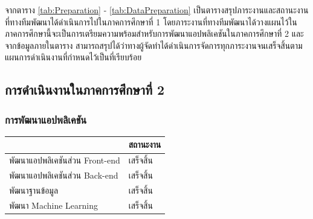 \documentclass[14pt,oneside,openright,a4paper]{cpe-thai-project}
\begin{document}
  จากตาราง \ref{tab:Preparation} - \ref{tab:DataPreparation} เป็นตารางสรุปภาระงานและสถานะงานที่ทางทีมพัฒนาได้ดำเนินการไปในภาคการศึกษาที่ 1 โดยภาระงานที่ทางทีมพัฒนาได้วางแผนไว้ในภาคการศึกษานี้จะเป็นการเตรียมความพร้อมสำหรับการพัฒนาแอปพลิเคชันในภาคการศึกษาที่ 2 
  และจากข้อมูลภายในตาราง สามารถสรุปได้ว่าทางผู้จัดทำได้ดำเนินการจัดการทุกภาระงานจนเสร็จสิ้นตามแผนการดำเนินงานที่กำหนดไว้เป็นที่เรียบร้อย

  \subsection{การดำเนินงานในภาคการศึกษาที่ 2}
  \subsubsection{การพัฒนาแอปพลิเคชัน}
    \begin{table}[H]\centering
      \begin{tabular}{|l|l|}
      \hline
      \rowcolor[HTML]{9FC5E8} 
      \multicolumn{1}{|c|}{\cellcolor[HTML]{9FC5E8}ภาระงาน} & \multicolumn{1}{c|}{\cellcolor[HTML]{9FC5E8}สถานะงาน} \\ \hline
      พัฒนาแอปพลิเคชันส่วน Front-end                                 & \cellcolor[HTML]{34FF34}เสร็จสิ้น                          \\ \hline
      พัฒนาแอปพลิเคชันส่วน Back-end                              & \cellcolor[HTML]{34FF34}เสร็จสิ้น                         \\ \hline
      พัฒนาฐานข้อมูล                      & \cellcolor[HTML]{34FF34}เสร็จสิ้น                         \\ \hline
      พัฒนา Machine Learning          & \cellcolor[HTML]{34FF34}เสร็จสิ้น                      \\ \hline
      \end{tabular}
      \label{tab:ApplicationDevelopment}
      \end{table}
      
\end{document}
